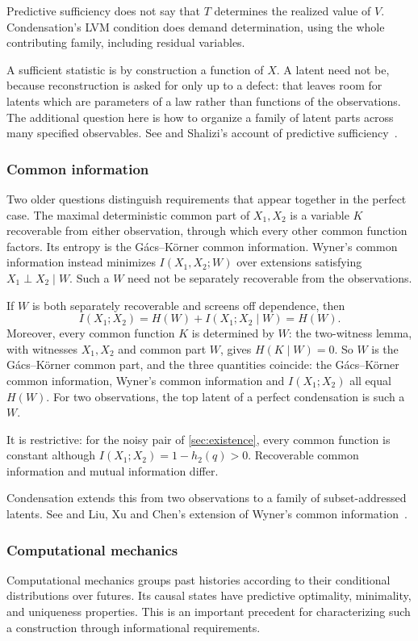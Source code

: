 \documentclass[11pt]{article}
\begin{document}
Predictive sufficiency does not say that $T$ determines the realized value of
$V$. Condensation's LVM condition does demand determination, using the whole
contributing family, including residual variables.

A sufficient statistic is by construction a function of $X$. A latent need not
be, because reconstruction is asked for only up to a defect: that leaves room
for latents which are parameters of a law rather than functions of the
observations. The additional
question here is how to organize a family of latent parts across many specified
observables. See \citet{fisher1922mathematical}
and Shalizi's account of predictive sufficiency~\citep{shalizi2019prediction}.

\subsubsection{Common information}
Two older questions distinguish requirements that appear together in the
perfect case. The maximal deterministic common part of $X_1,X_2$ is a variable
$K$ recoverable from either observation, through which every other common
function factors. Its entropy is the G\'acs--K\"orner common information.
Wyner's common information instead minimizes $I(X_1,X_2;W)$ over extensions
satisfying $X_1\perp X_2\mid W$. Such a $W$ need not be separately recoverable
from the observations.

If $W$ is both separately recoverable and screens off dependence, then
\[
 I(X_1;X_2)=H(W)+I(X_1;X_2\mid W)=H(W).
\]
Moreover, every common function $K$ is determined by $W$: the two-witness lemma,
with witnesses $X_1,X_2$ and common part $W$, gives $H(K\mid W)=0$.
So $W$ is the G\'acs--K\"orner common part, and the three quantities coincide:
the G\'acs--K\"orner common information, Wyner's common information and
$I(X_1;X_2)$ all equal $H(W)$. For two observations, the top latent of a perfect
condensation is such a $W$.

It is restrictive: for the noisy pair of \cref{sec:existence}, every common
function is constant although $I(X_1;X_2)=1-h_2(q)>0$. Recoverable common
information and mutual information differ.

Condensation extends this from two observations to a family of
subset-addressed latents.
See \citet{gacs1973common}
and Liu, Xu and Chen's extension of Wyner's common information~\citep{liu2010common}.

\subsubsection{Computational mechanics}
Computational mechanics groups past histories according to their conditional
distributions over futures. Its causal states have predictive optimality,
minimality, and uniqueness properties. This is an important precedent for
characterizing such a construction through informational requirements.
\end{document}
